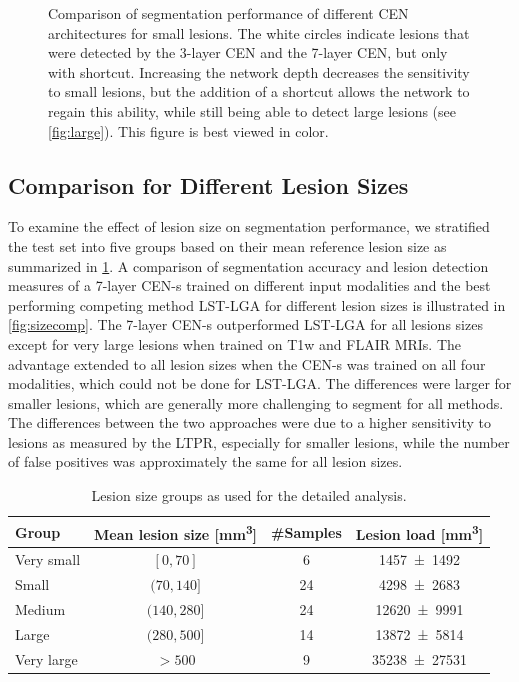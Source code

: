 \begin{figure}[p]
\caption[Comparison of segmentation performance of different CEN architectures
for small lesions]{Comparison of segmentation performance of different CEN architectures
for small lesions. The white circles indicate lesions that were detected by the
3-layer CEN and the 7-layer CEN, but only with shortcut. Increasing the network
depth decreases the sensitivity to small lesions, but the addition of a
shortcut allows the network to regain this ability, while still being able to
detect large lesions (see \ref{fig:large}). This figure is best viewed in
color.}
\label{fig:small}
\end{figure}

\subsection[Comparison for different lesion sizes]{Comparison for Different
Lesion Sizes}

To examine the effect of lesion size on segmentation performance, we stratified
the test set into five groups based on their mean reference lesion size as
summarized in \ref{tab:groups}. A comparison of segmentation accuracy and lesion
detection measures of a 7-layer CEN-s trained on different input modalities and
the best performing competing method LST-LGA for different lesion sizes is
illustrated in \ref{fig:sizecomp}. The 7-layer CEN-s outperformed LST-LGA for
all lesions sizes except for very large lesions when trained on T1w and FLAIR
MRIs. The advantage extended to all lesion sizes when the \mbox{CEN-s} was
trained on all four modalities, which could not be done for LST-LGA.
The differences were larger for smaller lesions, which are generally more
challenging to segment for all methods. The differences between the two
approaches were due to a higher sensitivity to lesions as measured by the LTPR,
especially for smaller lesions, while the number of false positives was
approximately the same for all lesion sizes.

\begin{table}[tb]
\caption{Lesion size groups as used for the detailed analysis.}
\label{tab:groups}
\centering
\begin{tabular}{@{}lccc@{}}
\toprule
Group & Mean lesion size [\si{\cubic\milli\metre}] & \#Samples & Lesion
load [\si{\cubic\milli\metre}] \\
\midrule
Very small & $[0,70]$ & 6 & \num{1457+-1492} \\
Small      & $(70,140]$ & 24 & \num{4298+-2683} \\
Medium & $(140,280]$ & 24 & \num{12620+-9991} \\
Large & $(280,500]$ & 14 & \num{13872+-5814} \\
Very large & $> 500$ & 9 & \num{35238+-27531} \\
\bottomrule
\end{tabular}
\end{table}

